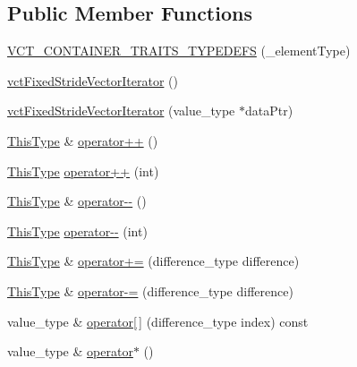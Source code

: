 \subsection*{Public Member Functions}
\begin{DoxyCompactItemize}
\item 
\hyperlink{classvct_fixed_stride_vector_iterator_ab6f5f51f65b48c86fc2fb63260e29db2}{V\+C\+T\+\_\+\+C\+O\+N\+T\+A\+I\+N\+E\+R\+\_\+\+T\+R\+A\+I\+T\+S\+\_\+\+T\+Y\+P\+E\+D\+E\+F\+S} (\+\_\+element\+Type)
\item 
\hyperlink{classvct_fixed_stride_vector_iterator_a549576f58956f187628ea8c592bf1934}{vct\+Fixed\+Stride\+Vector\+Iterator} ()
\item 
\hyperlink{classvct_fixed_stride_vector_iterator_a222932d8d6e5ec48d36ded679bf78e6a}{vct\+Fixed\+Stride\+Vector\+Iterator} (value\+\_\+type $\ast$data\+Ptr)
\item 
\hyperlink{classvct_fixed_stride_vector_const_iterator_ac60fc9d8c2af56a7f251d9a7040efa1e}{This\+Type} \& \hyperlink{classvct_fixed_stride_vector_iterator_adb4af9e7403bf76a44d7310ef8191679}{operator++} ()
\item 
\hyperlink{classvct_fixed_stride_vector_const_iterator_ac60fc9d8c2af56a7f251d9a7040efa1e}{This\+Type} \hyperlink{classvct_fixed_stride_vector_iterator_a367701e515ebcb7bd5fe1e930cccb1e4}{operator++} (int)
\item 
\hyperlink{classvct_fixed_stride_vector_const_iterator_ac60fc9d8c2af56a7f251d9a7040efa1e}{This\+Type} \& \hyperlink{classvct_fixed_stride_vector_iterator_a7f2c805d26275ebda501c49725a3a037}{operator-\/-\/} ()
\item 
\hyperlink{classvct_fixed_stride_vector_const_iterator_ac60fc9d8c2af56a7f251d9a7040efa1e}{This\+Type} \hyperlink{classvct_fixed_stride_vector_iterator_a13bdba8881aee72c05dcddac46508dd6}{operator-\/-\/} (int)
\item 
\hyperlink{classvct_fixed_stride_vector_const_iterator_ac60fc9d8c2af56a7f251d9a7040efa1e}{This\+Type} \& \hyperlink{classvct_fixed_stride_vector_iterator_a326f5b716110462ec981434f667bd1c4}{operator+=} (difference\+\_\+type difference)
\item 
\hyperlink{classvct_fixed_stride_vector_const_iterator_ac60fc9d8c2af56a7f251d9a7040efa1e}{This\+Type} \& \hyperlink{classvct_fixed_stride_vector_iterator_a6cbd413bff4f998c7b27cf8802ce53c2}{operator-\/=} (difference\+\_\+type difference)
\item 
value\+\_\+type \& \hyperlink{classvct_fixed_stride_vector_iterator_a668dfba908528cdcfba0882ef2ae804d}{operator\mbox{[}$\,$\mbox{]}} (difference\+\_\+type index) const 
\item 
value\+\_\+type \& \hyperlink{classvct_fixed_stride_vector_iterator_a1f1b3bb2bd7e4e41e480cdcc97ef6d9a}{operator$\ast$} ()
\end{DoxyCompactItemize}
